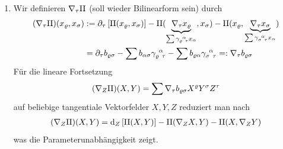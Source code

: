 \begin{enumerate}
 \item Wir definieren \(\nabla_\tau \Rom2\) (soll wieder Bilinearform sein) durch
 \begin{align*}
  (\nabla_\tau \Rom2)(x_\varrho, x_\sigma) &:= \partial_\tau \left[\Rom2(x_\varrho, x_\sigma)\right] - \Rom2 (\underbrace{\nabla_\tau x_\varrho}_{\sum \christ \varrho \alpha \tau x_\alpha}, x_\sigma) - \Rom2 (x_\varrho, \underbrace{\nabla_\tau x_\sigma}_{\sum \christ \sigma \alpha \tau x_\alpha}) \\
  &= \partial_\tau b_{\varrho \sigma} - \sum b_{\alpha \sigma} \christ \varrho \alpha \tau - \sum b_{\varrho \alpha} \christ \sigma \alpha \tau =: \nabla_\tau b_{\varrho \sigma}
 \end{align*}
 Für die lineare Fortsetzung
 \[
  (\nabla_Z \Rom2)(X,Y) = \sum \nabla_\tau b_{\varrho \sigma} X^\varrho Y^\sigma Z^\tau
 \]
 auf beliebige tangentiale Vektorfelder \(X,Y,Z\) reduziert man nach
 \begin{align*}
  (\nabla_Z \Rom2)(X,Y) = \dd_Z \left[ \Rom2(X,Y)\right] - \Rom2(\nabla_Z X,Y) - \Rom2(X , \nabla_Z Y)
 \end{align*}
 was die Parameterunabhängigkeit zeigt.


\end{enumerate}
